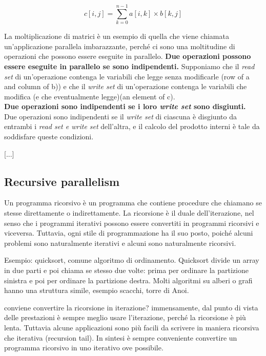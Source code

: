\documentclass[10pt,a4paper]{article}
\begin{document}
\[c[i,j]=\sum_{k=0}^{n-1} a[i,k]\times b[k,j]\]

La moltiplicazione di matrici è un esempio di quella che viene chiamata un'applicazione parallela imbarazzante, perché ci sono una moltitudine di operazioni che possono essere eseguite in parallelo. \textbf{Due operazioni possono essere eseguite in parallelo se sono indipendenti.} Supponiamo che il \textit{read set} di un'operazione contenga le variabili che legge senza modificarle (row of a and column of b)) e che il \textit{write set} di un'operazione contenga le variabili che modifica (e che eventualmente legge)(an element of c).\\ \textbf{Due operazioni sono indipendenti se i loro \textit{write set} sono disgiunti.}\\
Due operazioni sono indipendenti se il \textit{write set} di ciascuna è disgiunto da entrambi i \textit{read set e write set} dell'altra, e il calcolo del prodotto interni è tale da soddisfare queste condizioni.

[...]

\subsection{Recursive parallelism}
Un programma ricorsivo è un programma che contiene procedure che chiamano se stesse direttamente o indirettamente. La ricorsione è il duale dell'iterazione, nel senso che i programmi iterativi possono essere convertiti in programmi ricorsivi e viceversa. Tuttavia, ogni stile di programmazione ha il suo posto, poiché alcuni problemi sono naturalmente iterativi e alcuni sono naturalmente ricorsivi.

Esempio: quicksort, comune algoritmo di ordinamento. Quicksort divide un array in due parti e poi chiama se stesso due volte: prima per ordinare la partizione sinistra e poi per ordinare la partizione destra. Molti algoritmi su alberi o grafi hanno una struttura simile, esempio scacchi, torre di Anoi.

conviene convertire la ricorsione in iterazione? immensamente, dal punto di vista delle prestazioni è sempre meglio usare l'iterazione, perché la ricorsione è più lenta.
Tuttavia alcune applicazioni sono più facili da scrivere in maniera ricorsiva che iterativa (recursion tail).
In sintesi è sempre conveniente convertire un programma ricorsivo in uno iterativo ove possibile.
\end{document}
